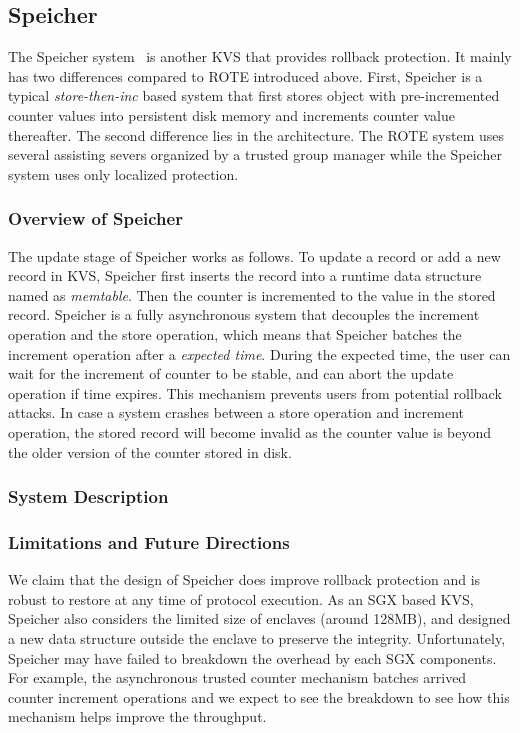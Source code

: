 \subsection{Speicher}

The Speicher system~\cite{} is another KVS that provides rollback protection.
It mainly has two differences compared to ROTE introduced above. First, 
Speicher is a typical \textit{store-then-inc} based system that first stores 
object with pre-incremented counter values into persistent disk memory and increments
counter value thereafter. The second difference lies in the architecture. The ROTE system
uses several assisting severs organized by a trusted group manager while the Speicher system 
uses only localized protection.


\subsubsection{Overview of Speicher}


The update stage of Speicher works as follows. To update a record or add a new 
record in KVS, Speicher first inserts the record into a runtime data structure
named as \textit{memtable}. Then the counter is incremented to the value in 
the stored record. Speicher is a fully asynchronous system that decouples the 
increment operation and the store operation, which means that Speicher batches
the increment operation after a \textit{expected time}. During the expected 
time, the user can wait for the increment of counter to be stable, and can 
abort the update operation if time expires. This mechanism prevents users 
from potential rollback attacks. In case a system crashes between a store
operation and increment operation, the stored record will become invalid as 
the counter value is beyond the older version of the counter stored in disk.




\subsubsection{System Description}






\subsubsection{Limitations and Future Directions}

We claim that the design of Speicher does improve rollback protection and is robust to 
restore at any time of protocol execution. As an SGX based KVS, Speicher also considers 
the limited size of enclaves (around 128MB), and designed a new data structure outside 
the enclave to preserve the integrity. Unfortunately, Speicher may have failed to breakdown 
the overhead by each SGX components. For example, the asynchronous trusted counter mechanism
batches arrived counter increment operations and we expect to see the breakdown to see how 
this mechanism helps improve the throughput.


